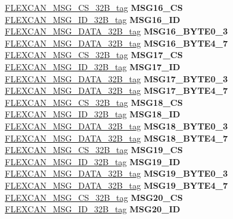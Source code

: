 \begin{DoxyCompactItemize}
\begin{tabbing}
\>\>\mbox{\hyperlink{unionFLEXCAN__MSG__CS__32B__tag}{FLEXCAN\_MSG\_CS\_32B\_tag}} {\bfseries MSG16\_CS}\\
\>\>\mbox{\hyperlink{unionFLEXCAN__MSG__ID__32B__tag}{FLEXCAN\_MSG\_ID\_32B\_tag}} {\bfseries MSG16\_ID}\\
\>\>\mbox{\hyperlink{unionFLEXCAN__MSG__DATA__32B__tag}{FLEXCAN\_MSG\_DATA\_32B\_tag}} {\bfseries MSG16\_BYTE0\_3}\\
\>\>\mbox{\hyperlink{unionFLEXCAN__MSG__DATA__32B__tag}{FLEXCAN\_MSG\_DATA\_32B\_tag}} {\bfseries MSG16\_BYTE4\_7}\\
\>\>\mbox{\hyperlink{unionFLEXCAN__MSG__CS__32B__tag}{FLEXCAN\_MSG\_CS\_32B\_tag}} {\bfseries MSG17\_CS}\\
\>\>\mbox{\hyperlink{unionFLEXCAN__MSG__ID__32B__tag}{FLEXCAN\_MSG\_ID\_32B\_tag}} {\bfseries MSG17\_ID}\\
\>\>\mbox{\hyperlink{unionFLEXCAN__MSG__DATA__32B__tag}{FLEXCAN\_MSG\_DATA\_32B\_tag}} {\bfseries MSG17\_BYTE0\_3}\\
\>\>\mbox{\hyperlink{unionFLEXCAN__MSG__DATA__32B__tag}{FLEXCAN\_MSG\_DATA\_32B\_tag}} {\bfseries MSG17\_BYTE4\_7}\\
\>\>\mbox{\hyperlink{unionFLEXCAN__MSG__CS__32B__tag}{FLEXCAN\_MSG\_CS\_32B\_tag}} {\bfseries MSG18\_CS}\\
\>\>\mbox{\hyperlink{unionFLEXCAN__MSG__ID__32B__tag}{FLEXCAN\_MSG\_ID\_32B\_tag}} {\bfseries MSG18\_ID}\\
\>\>\mbox{\hyperlink{unionFLEXCAN__MSG__DATA__32B__tag}{FLEXCAN\_MSG\_DATA\_32B\_tag}} {\bfseries MSG18\_BYTE0\_3}\\
\>\>\mbox{\hyperlink{unionFLEXCAN__MSG__DATA__32B__tag}{FLEXCAN\_MSG\_DATA\_32B\_tag}} {\bfseries MSG18\_BYTE4\_7}\\
\>\>\mbox{\hyperlink{unionFLEXCAN__MSG__CS__32B__tag}{FLEXCAN\_MSG\_CS\_32B\_tag}} {\bfseries MSG19\_CS}\\
\>\>\mbox{\hyperlink{unionFLEXCAN__MSG__ID__32B__tag}{FLEXCAN\_MSG\_ID\_32B\_tag}} {\bfseries MSG19\_ID}\\
\>\>\mbox{\hyperlink{unionFLEXCAN__MSG__DATA__32B__tag}{FLEXCAN\_MSG\_DATA\_32B\_tag}} {\bfseries MSG19\_BYTE0\_3}\\
\>\>\mbox{\hyperlink{unionFLEXCAN__MSG__DATA__32B__tag}{FLEXCAN\_MSG\_DATA\_32B\_tag}} {\bfseries MSG19\_BYTE4\_7}\\
\>\>\mbox{\hyperlink{unionFLEXCAN__MSG__CS__32B__tag}{FLEXCAN\_MSG\_CS\_32B\_tag}} {\bfseries MSG20\_CS}\\
\>\>\mbox{\hyperlink{unionFLEXCAN__MSG__ID__32B__tag}{FLEXCAN\_MSG\_ID\_32B\_tag}} {\bfseries MSG20\_ID}\\

\end{tabbing}
\end{DoxyCompactItemize}
